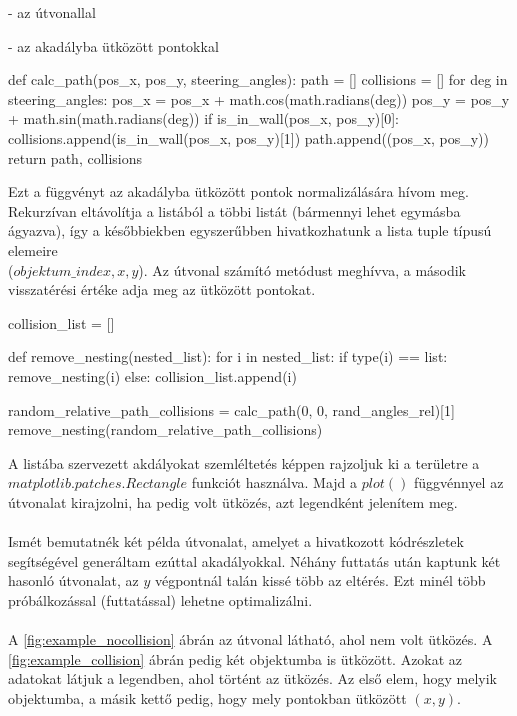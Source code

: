 - az útvonallal

- az akadályba ütközött pontokkal

\begin{python}
def calc_path(pos_x, pos_y, steering_angles):
    path = []
    collisions = []
    for deg in steering_angles:
        pos_x = pos_x + math.cos(math.radians(deg))
        pos_y = pos_y + math.sin(math.radians(deg))
        if is_in_wall(pos_x, pos_y)[0]:
            collisions.append(is_in_wall(pos_x, pos_y)[1])
        path.append((pos_x, pos_y))
    return path, collisions
\end{python}

Ezt a függvényt az akadályba ütközött pontok normalizálására hívom meg. Rekurzívan eltávolítja a listából a többi listát (bármennyi lehet egymásba ágyazva), így a későbbiekben egyszerűbben hivatkozhatunk a lista tuple típusú elemeire\\
($objektum\_index, x, y$). Az útvonal számító metódust meghívva, a második visszatérési értéke adja meg az ütközött pontokat.

\begin{python}
collision_list = []

def remove_nesting(nested_list):
    for i in nested_list:
        if type(i) == list:
            remove_nesting(i)
        else:
            collision_list.append(i)
            
random_relative_path_collisions = calc_path(0, 0, rand_angles_rel)[1]            
remove_nesting(random_relative_path_collisions)
\end{python}

A listába szervezett akdályokat szemléltetés képpen rajzoljuk ki a területre a \\
$ matplotlib.patches.Rectangle $ funkciót használva. Majd a $ plot() $ függvénnyel az útvonalat kirajzolni, ha pedig volt ütközés, azt legendként jelenítem meg.\\\\
Ismét bemutatnék két példa útvonalat, amelyet a hivatkozott kódrészletek segítségével generáltam ezúttal akadályokkal. Néhány futtatás után kaptunk két hasonló útvonalat, az $ y $ végpontnál talán kissé több az eltérés. Ezt minél több próbálkozással (futtatással) lehetne optimalizálni. \\\\
A \ref{fig:example_nocollision} ábrán az útvonal látható, ahol nem volt ütközés. A \ref{fig:example_collision} ábrán pedig két objektumba is ütközött. Azokat az adatokat látjuk a legendben, ahol történt az ütközés. Az első elem, hogy melyik objektumba, a másik kettő pedig, hogy mely pontokban ütközött $ (x, y) $.

